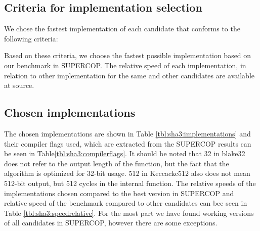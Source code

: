 \documentclass[english,12pt,a4paper]{book}
\begin{document}
\subsection{Criteria for implementation selection}

We chose the fastest implementation of each candidate that conforms to the
following criteria:

Based on these criteria, we choose the fastest possible implementation based
on our benchmark in \ac{SUPERCOP}. The relative speed of each implementation, in
relation to other implementation for the same and other candidates are
available at source.

\subsection{Chosen implementations}



The chosen implementations are shown in Table \ref{tbl:sha3:implementations}
and their compiler flags used, which are extracted from the \ac{SUPERCOP}
results can be seen in Table\ref{tbl:sha3:compilerflags}. It should be noted
that 32 in blake32 does not refer to the output length of the function, but the
fact that the algorithm is optimized for 32-bit usage. 512 in Keccackc512 also
does not mean 512-bit output, but 512 cycles in the internal function. The
relative speeds of the implementations chosen compared to the best version in
\ac{SUPERCOP} and relative speed of the benchmark compared to other candidates
can bee seen in Table \ref{tbl:sha3:speedrelative}. For the most part we have
found working versions of all candidates in \ac{SUPERCOP}, however there are
some exceptions. 




\end{document}
